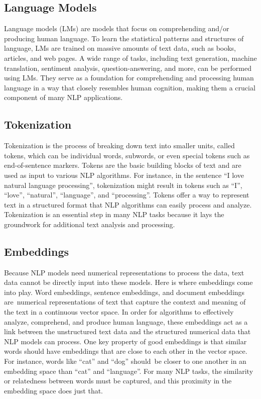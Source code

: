 \subsection*{Language Models}

Language models (LMs) are models that focus on comprehending and/or producing human language. To learn the statistical patterns and structures of language, LMs are trained on massive amounts of text data, such as books, articles, and web pages. A wide range of tasks, including text generation, machine translation, sentiment analysis, question-answering, and more, can be performed using LMs. They serve as a foundation for comprehending and processing human language in a way that closely resembles human cognition, making them a crucial component of many NLP applications.

\subsection*{Tokenization}

Tokenization is the process of breaking down text into smaller units, called tokens, which can be individual words, subwords, or even special tokens such as end-of-sentence markers. Tokens are the basic building blocks of text and are used as input to various NLP algorithms. For instance, in the sentence ``I love natural language processing'', tokenization might result in tokens such as ``I'', ``love'', ``natural'', ``language'', and ``processing''. Tokens offer a way to represent text in a structured format that NLP algorithms can easily process and analyze. Tokenization is an essential step in many NLP tasks because it lays the groundwork for additional text analysis and processing.

\subsection*{Embeddings}

Because NLP models need numerical representations to process the data, text data cannot be directly input into these models. Here is where embeddings come into play. Word embeddings, sentence embeddings, and document embeddings are numerical representations of text that capture the context and meaning of the text in a continuous vector space. In order for algorithms to effectively analyze, comprehend, and produce human language, these embeddings act as a link between the unstructured text data and the structured numerical data that NLP models can process. One key property of good embeddings is that similar words should have embeddings that are close to each other in the vector space. For instance, words like ``cat'' and ``dog'' should be closer to one another in an embedding space than ``cat'' and ``language''. For many NLP tasks, the similarity or relatedness between words must be captured, and this proximity in the embedding space does just that.


